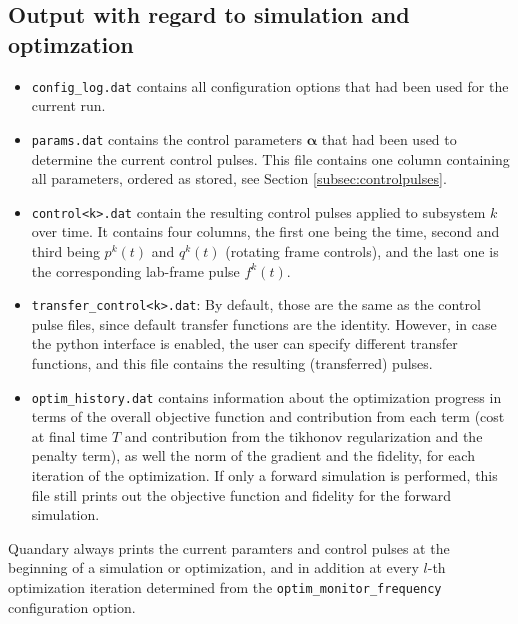\documentclass[11pt]{article}
\newcommand{\bfa}{\boldsymbol{\alpha}}
\begin{document}
\subsection{Output with regard to simulation and optimzation}
\begin{itemize}
  \item \texttt{config\_log.dat} contains all configuration options that had been used for the current run. 
  \item \texttt{params.dat} contains the control parameters $\bfa$ that had been used to determine the current control pulses. This file contains one column containing all parameters, ordered as stored, see Section \ref{subsec:controlpulses}.
  \item \texttt{control<k>.dat} contain the resulting control pulses applied to subsystem $k$ over time. It contains four columns, the first one being the time, second and third being $p^k(t)$ and $q^k(t)$ (rotating frame controls), and the last one is the corresponding lab-frame pulse $f^k(t)$.
  \item \texttt{transfer\_control<k>.dat}: By default, those are the same as the control pulse files, since default transfer functions are the identity. However, in case the python interface is enabled, the user can specify different transfer functions, and this file contains the resulting (transferred) pulses. 
  \item \texttt{optim\_history.dat} contains information about the optimization progress in terms of the overall objective function and contribution from each term (cost at final time $T$ and contribution from the tikhonov regularization and the penalty term), as well the norm of the gradient and the fidelity, for each iteration of the optimization. If only a forward simulation is performed, this file still prints out the objective function and fidelity for the forward simulation. 
\end{itemize}
Quandary always prints the current paramters and control pulses at the beginning of a simulation or optimization, and in addition at every $l$-th optimization iteration determined from the \texttt{optim\_monitor\_frequency} configuration option. 
\end{document}
